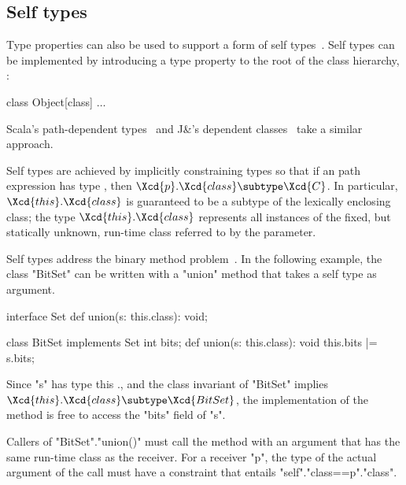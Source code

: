 \subsection{Self types}

Type properties can also be used to support a form of self
types~\cite{bruce-binary,bsg95}.
%
Self types can be implemented by introducing a
type property  to the root of the class hierarchy, :
{\footnotesize
\begin{xtenmath}
class Object[class] { $\dots$ }
\end{xtenmath}}
Scala's path-dependent types~\cite{scala} and J\&'s
dependent classes~\cite{nqm06}
take a similar approach.

Self types are achieved by
implicitly constraining types so that if an path expression 
has type , then
$\Xcd{p}.\Xcd{class} \subtype \Xcd{C}$.  In particular,
$\Xcd{this}.\Xcd{class}$ is guaranteed to be a subtype
of the lexically enclosing class; the type
$\Xcd{this}.\Xcd{class}$ represents all instances of the fixed,
but statically unknown, run-time class referred to by the 
parameter.

Self types address the binary method problem~\cite{bruce-binary}.
In the following
example, the class \xcd"BitSet" can be written with a
\xcd"union" method that takes a self type as argument.

{\footnotesize
\begin{xtenmath}
interface Set {
  def union(s: this.class): void;
}

class BitSet implements Set {
  int bits;
  def union(s: this.class): void {
    this.bits |= s.bits;
  }
}
\end{xtenmath}}

\noindent
Since \xcd"s" has type this ., and the class
invariant of \xcd"BitSet" implies
$\Xcd{this}.\Xcd{class} \subtype \Xcd{BitSet}$,
the implementation of the method is free to access the
\xcd"bits" field of \xcd"s".

Callers of \xcd"BitSet".\xcd"union()" must call the method with
an argument that has the same run-time class as the
receiver.  For a receiver \xcd"p", the
type of the actual argument of the call must have a constraint
that entails \xcd"self".\xcd"class==p".\xcd"class".


